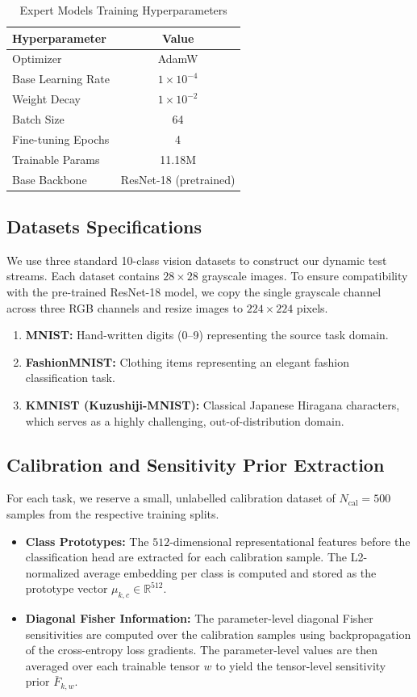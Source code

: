 \documentclass{article}
\theoremstyle{plain}
\theoremstyle{definition}
\theoremstyle{remark}
\begin{document}
\begin{table}[h]
\centering
\caption{Expert Models Training Hyperparameters}
\label{tab:expert_hyperparams}
\vskip 0.1in
\begin{small}
\begin{tabular}{lc}
\toprule
Hyperparameter & Value \\
\midrule
Optimizer & AdamW \\
Base Learning Rate & $1 \times 10^{-4}$ \\
Weight Decay & $1 \times 10^{-2}$ \\
Batch Size & 64 \\
Fine-tuning Epochs & 4 \\
Trainable Params & 11.18M \\
Base Backbone & ResNet-18 (pretrained) \\
\bottomrule
\end{tabular}
\end{small}
\end{table}

\subsection{Datasets Specifications}
We use three standard 10-class vision datasets to construct our dynamic test streams. Each dataset contains $28 \times 28$ grayscale images. To ensure compatibility with the pre-trained ResNet-18 model, we copy the single grayscale channel across three RGB channels and resize images to $224 \times 224$ pixels.
\begin{enumerate}
  \item \textbf{MNIST:} Hand-written digits (0--9) representing the source task domain.
  \item \textbf{FashionMNIST:} Clothing items representing an elegant fashion classification task.
  \item \textbf{KMNIST (Kuzushiji-MNIST):} Classical Japanese Hiragana characters, which serves as a highly challenging, out-of-distribution domain.
\end{enumerate}

\subsection{Calibration and Sensitivity Prior Extraction}
For each task, we reserve a small, unlabelled calibration dataset of $N_{\text{cal}} = 500$ samples from the respective training splits.
\begin{itemize}
  \item \textbf{Class Prototypes:} The $512$-dimensional representational features before the classification head are extracted for each calibration sample. The L2-normalized average embedding per class is computed and stored as the prototype vector $\mu_{k,c} \in \mathbb{R}^{512}$.
  \item \textbf{Diagonal Fisher Information:} The parameter-level diagonal Fisher sensitivities are computed over the calibration samples using backpropagation of the cross-entropy loss gradients. The parameter-level values are then averaged over each trainable tensor $w$ to yield the tensor-level sensitivity prior $\bar{F}_{k,w}$.
\end{itemize}
\end{document}
